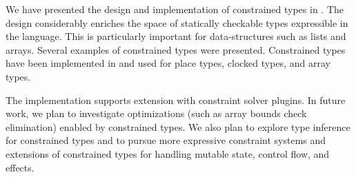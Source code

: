 %
%
%
%

We have presented the design and implementation of 
constrained types in \Xten{}.
The design considerably enriches the space of
statically checkable types expressible in the language. This is
particularly important for data-structures such as lists and arrays.
Several examples of constrained types were presented.
Constrained types have been implemented in \Xten{}
and used for place types, clocked types, and array types.

The implementation supports extension with constraint solver plugins.
In future work,
we plan to investigate
optimizations (such as array
bounds check elimination) enabled by constrained types.
We also plan to explore type inference for constrained types
and to pursue more expressive constraint systems and
extensions of constrained types for handling mutable state,
control flow, and effects.
